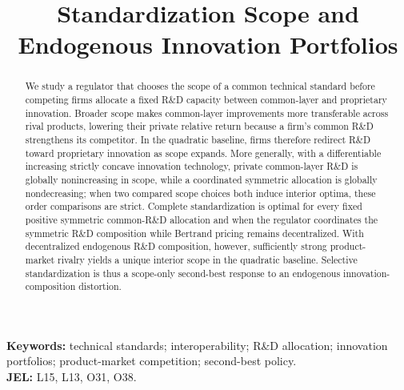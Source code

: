\documentclass[11pt]{article}
\title{Standardization Scope and Endogenous Innovation Portfolios}
\author{}
\date{}
\begin{document}
\maketitle
\begin{abstract}
We study a regulator that chooses the scope of a common technical standard before competing firms allocate a fixed R\&D capacity between common-layer and proprietary innovation. Broader scope makes common-layer improvements more transferable across rival products, lowering their private relative return because a firm's common R\&D strengthens its competitor. In the quadratic baseline, firms therefore redirect R\&D toward proprietary innovation as scope expands. More generally, with a differentiable increasing strictly concave innovation technology, private common-layer R\&D is globally nonincreasing in scope, while a coordinated symmetric allocation is globally nondecreasing; when two compared scope choices both induce interior optima, these order comparisons are strict. Complete standardization is optimal for every fixed positive symmetric common-R\&D allocation and when the regulator coordinates the symmetric R\&D composition while Bertrand pricing remains decentralized. With decentralized endogenous R\&D composition, however, sufficiently strong product-market rivalry yields a unique interior scope in the quadratic baseline. Selective standardization is thus a scope-only second-best response to an endogenous innovation-composition distortion.
\end{abstract}

\noindent\textbf{Keywords:} technical standards; interoperability; R\&D allocation; innovation portfolios; product-market competition; second-best policy.\\
\noindent\textbf{JEL:} L15, L13, O31, O38.








\appendix




\end{document}

